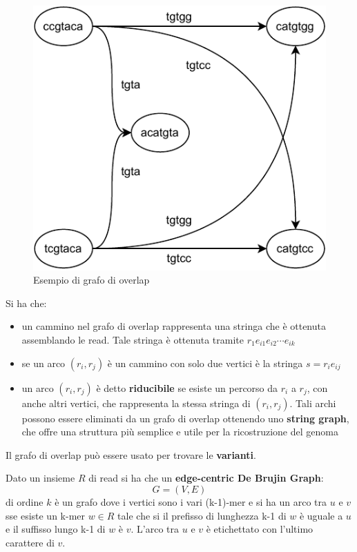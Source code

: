 \documentclass[a4paper,12pt, oneside]{book}
\begin{document}
\begin{figure}
    \centering
    \includegraphics[scale = 0.8]{img/olc.pdf}
    \caption{Esempio di grafo di overlap}
  \end{figure}
Si ha che:
\begin{itemize}
  \item un cammino nel grafo di overlap rappresenta una stringa che è ottenuta
  assemblando le read. Tale stringa è ottenuta tramite $r_1e_{i1}e_{i2}\cdots
  e_{ik}$
  \item se un arco $(r_i,r_j)$ è un cammino con solo due vertici è la stringa
  $s=r_ie_{ij}$ 
  \item  un arco $(r_i,r_j)$ è detto \textbf{riducibile} se esiste un
  percorso da $r_i$ a $r_j$, con anche altri vertici, che rappresenta la stessa
  stringa di $(r_i,r_j)$. Tali archi possono essere eliminati da un grafo di
  overlap ottenendo uno \textbf{string graph}, che offre una struttura più
  semplice e utile per la ricostruzione del genoma
\end{itemize}
Il grafo di overlap può essere usato per trovare le \textbf{varianti}.
\begin{definizione}
  Dato un insieme $R$ di read si ha che un \textbf{edge-centric De Brujin
    Graph}:
  \[G=(V,E)\]
  di ordine $k$ è un grafo dove i vertici sono i vari (k-1)-mer e si ha un arco
  tra $u$ e $v$ sse esiste un k-mer $w\in R$ tale che si il prefisso di
  lunghezza k-1 di $w$ è uguale a $u$ e il suffisso lungo k-1 di $w$ è
  $v$. L'arco tra $u$ e $v$ è etichettato con l'ultimo carattere di $v$.
  
\end{definizione}
\end{document}
